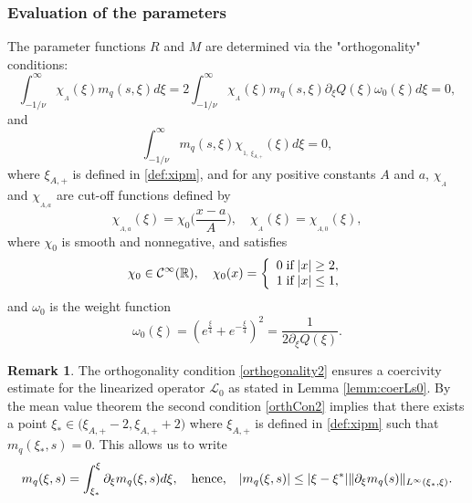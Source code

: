 \documentclass[11pt]{aims}
\theoremstyle{definition}
\newtheorem{remark}[theorem]{Remark}
\newcommand{\Rb}{\mathbb{R}}
\newcommand{\Cc}{\mathcal{C}}
\newcommand{\Ls}{\mathscr{L}}
\newcommand{\pa}{\partial}
\numberwithin{equation}{section}
\begin{document}
\subsubsection{Evaluation of the parameters} The parameter functions $R$ and $M$ are determined via the  "orthogonality" conditions:
\begin{equation} \label{orthogonality2}
\int_{-1/\nu}^\infty \chi_{_A}(\xi) m_q(s,\xi)d\xi=2 \int_{-1/\nu}^\infty \chi_{_A}(\xi) m_q(s,\xi) \pa_\xi Q(\xi) \omega_0(\xi)d\xi=0,
\end{equation}
and 
\begin{equation} \label{orthCon2}
\int_{-1/\nu}^\infty m_q(s,\xi) \chi_{_{1,\; \xi_{A,+}} }(\xi) d\xi =0,
\end{equation}
where $\xi_{A,+}$ is defined in \eqref{def:xipm}, and for any positive constants $A$ and $a$, $\chi_{_A}$ and $\chi_{_{A, a}}$ are cut-off functions defined by 
\begin{equation}\label{def:chiA}
 \chi_{_{A, a}}(\xi) = \chi_0\Big( \frac{x - a}{A}\Big), \quad \chi_{_A}(\xi) = \chi_{_{A,0}}(\xi), 
\end{equation}
where $\chi_0$ is smooth and nonnegative, and satisfies
\begin{equation*}
\chi_0 \in \Cc^\infty(\Rb), \quad  \chi_0(x) =  \left\{ \begin{array}{l} 0 \; \textup{if} \; |x| \geq 2,\\
1 \; \textup{if}\; |x| \leq 1,\\
\end{array}\right.
\end{equation*}
and $\omega_0$ is the weight function
\begin{equation} \label{def:omega}
\omega_0(\xi) = \left(e^{\frac{\xi}{4}}+e^{-\frac{\xi}{4}} \right)^2=\frac{1}{2 \pa_\xi Q(\xi)} .
\end{equation}
\begin{remark} The orthogonality condition \eqref{orthogonality2} ensures a coercivity estimate for the linearized operator $\Ls_0$ as stated in Lemma \ref{lemm:coerLs0}.  By the mean value theorem the second condition \eqref{orthCon2} implies that there exists a point $\xi_* \in \big(\xi_{A,+}-2, \xi_{A,+}+2\big)$ where $\xi_{A,+}$ is defined in \eqref{def:xipm} such that $m_q(\xi_*,s) = 0$. This allows us to write
\begin{equation}\label{est:mqbydev}
m_q(\xi, s) = \int_{\xi_*}^\xi \partial_\xi m_q(\xi, s) d\xi, \quad \textup{hence,}\quad  |m_q(\xi, s)| \leq |\xi - \xi^*| \| \pa_\xi m_q( s)\|_{L^\infty (\xi_*,\xi)}. 
\end{equation}
\end{remark}
\end{document}
